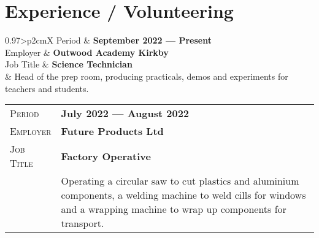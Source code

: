 \documentclass[a4paper, oneside, final]{scrartcl} %
\newcommand{\gray}{\rowcolor[gray]{.90}} %
\begin{document}
\begin{center} %


{\fontsize{20}{36}\selectfont\scshape{}} %

\vspace{1.5cm} %




\section{Experience / Volunteering}

\begin{tabularx}{0.97\linewidth}{>{\raggedleft\scshape}p{2cm}X}
	\gray Period & \textbf{September 2022 --- Present}\\
	\gray Employer & \textbf{Outwood Academy Kirkby}\\
	\gray Job Title & \textbf{Science Technician}\\
	& Head of the prep room, producing practicals, demos and experiments for teachers and students.
\end{tabularx}

\vspace{12pt}

\begin{tabularx}{0.97\linewidth}{>{\raggedleft\scshape}p{2cm}X}
	\gray Period & \textbf{July 2022 --- August 2022}\\
	\gray Employer & \textbf{Future Products Ltd}\\
	\gray Job Title & \textbf{Factory Operative}\\
	& Operating a circular saw to cut plastics and aluminium components, a welding machine to weld cills for windows and a wrapping machine to wrap up components for transport.
\end{tabularx}


\end{center}
\end{document}
